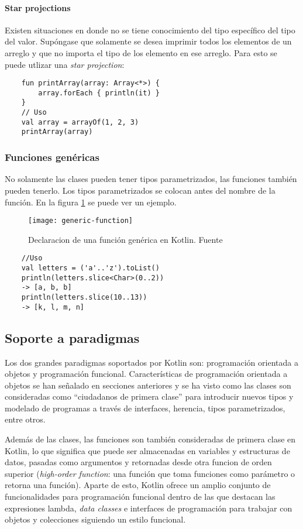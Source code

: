 \paragraph{Star projections}
Existen situaciones en donde no se tiene conocimiento del tipo específico del tipo del valor. Supóngase que solamente se desea imprimir todos los elementos de un arreglo y que no importa el tipo de los elemento en ese arreglo. Para esto se puede utlizar una \emph{star projection}:
\begin{verbatim}
    fun printArray(array: Array<*>) {
        array.forEach { println(it) }
    }
    // Uso
    val array = arrayOf(1, 2, 3)
    printArray(array)
\end{verbatim}

\subsubsection{Funciones genéricas}
No solamente las clases pueden tener tipos parametrizados, las funciones también pueden tenerlo. Los tipos parametrizados se colocan antes del nombre de la función. En la figura \ref{fig:kotlin-generic-function-declaration} se puede ver un ejemplo.
\begin{figure}[h!]
  \texttt{[image: generic-function]}
  \caption{Declaracion de una función genérica en Kotlin. Fuente \cite{kotlin-in-action}}
  \label{fig:kotlin-generic-function-declaration}
\end{figure} 
\begin{verbatim}
    //Uso
    val letters = ('a'..'z').toList()
    println(letters.slice<Char>(0..2))
    -> [a, b, b]
    println(letters.slice(10..13))
    -> [k, l, m, n]
\end{verbatim}



\subsection{Soporte a paradigmas}
Los dos grandes paradigmas soportados por Kotlin son: programación orientada a objetos y programación funcional. Características de programación orientada a objetos se han señalado en secciones anteriores y se ha visto como las clases son consideradas como ``ciudadanos de primera clase'' para introducir nuevos tipos y modelado de programas a través de interfaces, herencia, tipos parametrizados, entre otros.

Además de las clases, las funciones son también consideradas de primera clase en Kotlin, lo que significa que puede ser almacenadas en variables y estructuras de datos, pasadas como argumentos y retornadas desde otra funcion de orden superior (\emph{high-order function}: una función que toma funciones como parámetro o retorna una función). Aparte de esto, Kotlin ofrece un amplio conjunto de funcionalidades para programación funcional dentro de las que destacan las expresiones lambda, \emph{data classes} e interfaces de programación para trabajar con objetos y colecciones siguiendo un estilo funcional.

